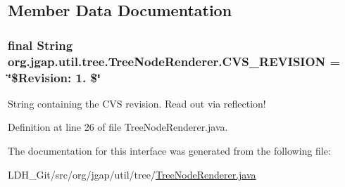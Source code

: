 \subsection{Member Data Documentation}
\hypertarget{interfaceorg_1_1jgap_1_1util_1_1tree_1_1_tree_node_renderer_aaba3f77aa27449486a12d6cdf7004f6e}{
\subsubsection[{C\-V\-S\-\_\-\-R\-E\-V\-I\-S\-I\-O\-N}]{\setlength{\rightskip}{0pt plus 5cm}final String org.\-jgap.\-util.\-tree.\-Tree\-Node\-Renderer.\-C\-V\-S\-\_\-\-R\-E\-V\-I\-S\-I\-O\-N = \char`\"{}\$Revision\-: 1. \$\char`\"{}\hspace{0.3cm}{\ttfamily [static]}}}\label{interfaceorg_1_1jgap_1_1util_1_1tree_1_1_tree_node_renderer_aaba3f77aa27449486a12d6cdf7004f6e}
String containing the C\-V\-S revision. Read out via reflection! 

Definition at line 26 of file Tree\-Node\-Renderer.\-java.



The documentation for this interface was generated from the following file\-:\begin{DoxyCompactItemize}
\item 
L\-D\-H\-\_\-\-Git/src/org/jgap/util/tree/\hyperlink{_tree_node_renderer_8java}{Tree\-Node\-Renderer.\-java}\end{DoxyCompactItemize}
